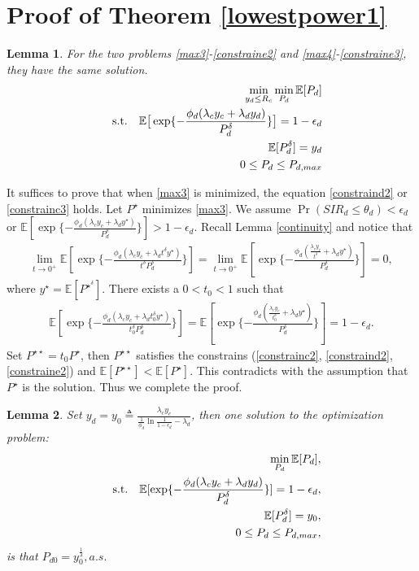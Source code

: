 \documentclass[12pt, draftclsnofoot, journal, letterpaper, onecolumn]{IEEEtran}
\newtheorem{lemma}{Lemma}[section]
\begin{document}
\section{Proof of Theorem \ref{lowestpower1}}\label{lowestpower1proof}
\begin{lemma}\label{eq}
For the two problems \eqref{max3}-\eqref{constraine2} and \eqref{max4}-\eqref{constraine3}, they have the same solution.\\
\begin{eqnarray}
&&\min_{y_d\leq R_c}\min_{P_d}\mathbb{E}[P_d]\label{max4}\\
&&{\rm s.t.}~~~ \mathbb{E}\big[\exp\{-\frac{\phi_d(\lambda_cy_c+\lambda_dy_d)}{P_d^\delta}\}\big]=1-\epsilon_d\label{constrainc3}\\
&& ~~~~~~~\mathbb{E}[P_d^\delta]=y_d\label{constraind3}\\
&& ~~~~~~~0\leq P_d\leq P_{d,max}\label{constraine3}
\end{eqnarray}
\end{lemma}
\begin{IEEEproof}
It suffices to prove that when \eqref{max3} is minimized, the equation \eqref{constraind2} or \eqref{constrainc3} holds. Let $P^\star$ minimizes \eqref{max3}. We assume $\Pr(SIR_d\leq\theta_d)  < \epsilon_d$ or $\mathbb{E}[\exp\{-\frac{\phi_d(\lambda_cy_c+\lambda_dy^\star)}{P_d^\delta}\}]>1-\epsilon_d$. Recall Lemma \ref{continuity} and notice that
\begin{eqnarray*}
\lim_{t\to 0^+}\mathbb{E}[\exp\{-\frac{\phi_d(\lambda_cy_c+\lambda_dt^\delta y^\star)}{t^\delta P_d^\delta}\}]=\lim_{t\to 0^+}\mathbb{E}[\exp\{-\frac{\phi_d(\frac{\lambda_cy_c}{t^\delta}+\lambda_dy^\star)}{P_d^\delta}\}]=0,
\end{eqnarray*}
where $y^\star=\mathbb{E}[P^{{\star}^{\delta}}]$.
There exists a $0<t_0<1$ such that
\begin{eqnarray*}
\mathbb{E}[\exp\{-\frac{\phi_d(\lambda_cy_c+\lambda_dt_0^\delta y^\star)}{t_0^\delta P_d^\delta}\}]=\mathbb{E}[\exp\{-\frac{\phi_d(\frac{\lambda_cy_c}{t_0^\delta}+\lambda_dy^\star)}{P_d^\delta}\}]=1-\epsilon_d.
\end{eqnarray*}
Set $P^{\star\star}=t_0P^\star$, then $P^{\star\star}$ satisfies the constrains (\eqref{constrainc2}, \eqref{constraind2}, \eqref{constraine2}) and $\mathbb{E}[P^{\star\star}]<\mathbb{E}[P^\star]$. This contradicts with the assumption that $P^\star$ is the solution. Thus we complete the proof.
\end{IEEEproof}
\begin{lemma}
Set $y_d=y_0\triangleq\frac{\lambda_cy_c}{\frac{1}{\phi_d}\ln\frac{1}{1-\epsilon_d}-\lambda_d}$, then one solution to the optimization problem:
\begin{eqnarray}
&&\min_{P_d}\mathbb{E}[P_d],\nonumber\\
&&{\rm s.t.}~~~\mathbb{E}[\exp\{-\frac{\phi_d(\lambda_cy_c+\lambda_dy_d)}{P_d^\delta}\}]=1-\epsilon_d,\label{constrainf}\\
&& ~~~~~~~\mathbb{E}[P_d^\delta]=y_0,\nonumber\\
&& ~~~~~~~0\leq P_d\leq P_{d,max},\nonumber
\end{eqnarray}
is that $P_{d0}=y_0^\frac{1}{\delta},a.s.$
\end{lemma}
\end{document}
